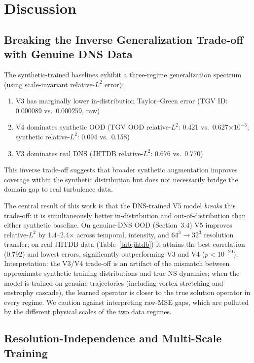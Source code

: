 \documentclass[review]{elsarticle}
\begin{document}
\section{Discussion}
\label{sec:discussion}

\subsection{Breaking the Inverse Generalization Trade-off with Genuine DNS Data}
\label{sec:tradeoff}

The synthetic-trained baselines exhibit a three-regime generalization spectrum (using scale-invariant relative-$L^2$ error):
\begin{enumerate}
    \item V3 has marginally lower in-distribution Taylor--Green error (TGV ID: 0.000089 vs.~0.000259, raw)
    \item V4 dominates synthetic OOD (TGV OOD relative-$L^2$: 0.421 vs.~0.627$\times 10^{-3}$; synthetic relative-$L^2$: 0.094 vs.~0.158)
    \item V3 dominates real DNS (JHTDB relative-$L^2$: 0.676 vs.~0.770)
\end{enumerate}
This inverse trade-off suggests that broader synthetic augmentation improves coverage within the synthetic distribution but does not necessarily bridge the domain gap to real turbulence data.

The central result of this work is that the DNS-trained V5 model \emph{breaks} this trade-off: it is simultaneously better in-distribution and out-of-distribution than either synthetic baseline. On genuine-DNS OOD (Section~3.4) V5 improves relative-$L^2$ by 1.4--2.4$\times$ across temporal, intensity, and $64^3\!\to\!32^3$ resolution transfer; on real JHTDB data (Table~\ref{tab:jhtdb}) it attains the best correlation (0.792) and lowest errors, significantly outperforming V3 and V4 ($p<10^{-20}$). Interpretation: the V3/V4 trade-off is an artifact of the mismatch between approximate synthetic training distributions and true NS dynamics; when the model is trained on genuine trajectories (including vortex stretching and enstrophy cascade), the learned operator is closer to the true solution operator in every regime. We caution against interpreting raw-MSE gaps, which are polluted by the different physical scales of the two data regimes.

\subsection{Resolution-Independence and Multi-Scale Training}
\label{sec:res-discussion}
\end{document}
